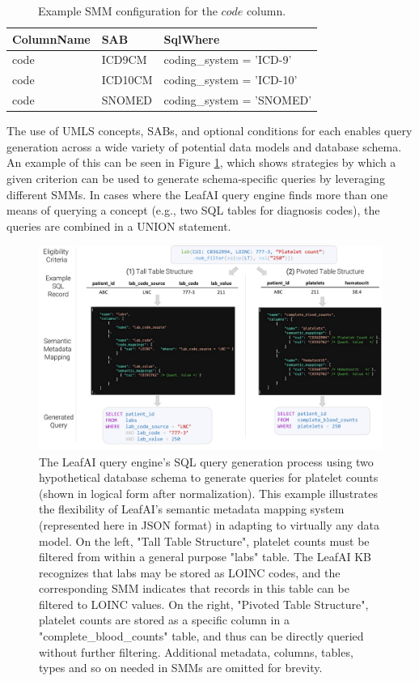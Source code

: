 \documentclass[../main.tex]{subfiles}
\begin{document}
\def\arraystretch{0.8}
\begin{table}[h!]
\centering
\begin{tabular}{l l l}
 \toprule
 \textbf{ColumnName} & \textbf{SAB} & \textbf{SqlWhere} \\
 \hline
    code & ICD9CM  & coding\_system = 'ICD-9' \\
    code & ICD10CM & coding\_system = 'ICD-10' \\
    code & SNOMED  & coding\_system = 'SNOMED' \\
 \hline
\end{tabular}
\caption{Example SMM configuration for the $code$ column. } 
\label{tbl_smm_column_config}
\end{table}

The use of UMLS concepts, SABs, and optional conditions for each enables query generation across a wide variety of potential data models and database schema. An example of this can be seen in Figure \ref{fig_leafai_smm}, which shows strategies by which a given criterion can be used to generate schema-specific queries by leveraging different SMMs. In cases where the LeafAI query engine finds more than one means of querying a concept (e.g., two SQL tables for diagnosis codes), the queries are combined in a UNION statement.

\begin{figure}[h!]
  \includegraphics[scale=0.47]{Figures/6_smm/leafai_smm.pdf}  
\caption{The LeafAI query engine's SQL query generation process using two hypothetical database schema to generate queries for platelet counts (shown in logical form after normalization). This example illustrates the flexibility of LeafAI's semantic metadata mapping system (represented here in JSON format) in adapting to virtually any data model. On the left, "Tall Table Structure", platelet counts must be filtered from within a general purpose "labs" table. The LeafAI KB recognizes that labs may be stored as LOINC codes, and the corresponding SMM indicates that records in this table can be filtered to LOINC values. On the right, "Pivoted Table Structure", platelet counts are stored as a specific column in a "complete\_blood\_counts" table, and thus can be directly queried without further filtering. Additional metadata, columns, tables, types and so on needed in SMMs are omitted for brevity.}
\label{fig_leafai_smm}
\end{figure}
\end{document}
